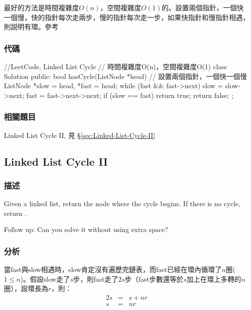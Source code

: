 最好的方法是時間複雜度$O(n)$，空間複雜度$O(1)$的。設置兩個指針，一個快一個慢，快的指針每次走兩步，慢的指針每次走一步，如果快指針和慢指針相遇，則説明有環。參考


\subsubsection{代碼}
\begin{Code}
//LeetCode, Linked List Cycle
// 時間複雜度O(n)，空間複雜度O(1)
class Solution {
public:
    bool hasCycle(ListNode *head) {
        // 設置兩個指針，一個快一個慢
        ListNode *slow = head, *fast = head;
        while (fast && fast->next) {
            slow = slow->next;
            fast = fast->next->next;
            if (slow == fast) return true;
        }
        return false;
    }
};
\end{Code}


\subsubsection{相關題目}
\begindot
\item Linked List Cycle II, 見 \S \ref{sec:Linked-List-Cycle-II}
\myenddot


\subsection{Linked List Cycle II}
\label{sec:linked-list-cycle-ii}


\subsubsection{描述}
Given a linked list, return the node where the cycle begins. If there is no cycle, return .

Follow up:
Can you solve it without using extra space?


\subsubsection{分析}
當fast與slow相遇時，slow肯定沒有遍歷完鏈表，而fast已經在環內循環了$n$圈($1 \leq n$)。假設slow走了$s$步，則fast走了$2s$步（fast步數還等於$s$加上在環上多轉的$n$圈），設環長為$r$，則：
\begin{eqnarray}
2s &=& s + nr \nonumber \\
s &=& nr \nonumber
\end{eqnarray}

